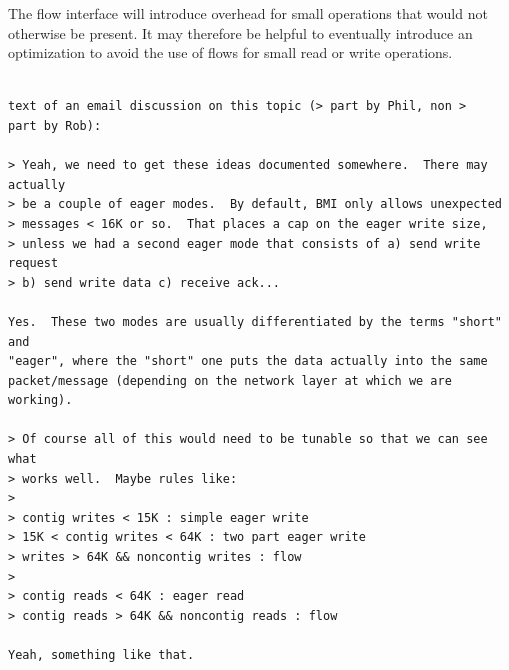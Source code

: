 \documentclass[12pt]{article} %
\begin{document}
The flow interface will introduce overhead for small operations
that would not otherwise be present.  It may therefore be helpful
to eventually introduce an optimization to avoid the use of flows
for small read or write operations.

\begin{verbatim}

text of an email discussion on this topic (> part by Phil, non >
part by Rob):

> Yeah, we need to get these ideas documented somewhere.  There may actually
> be a couple of eager modes.  By default, BMI only allows unexpected
> messages < 16K or so.  That places a cap on the eager write size,
> unless we had a second eager mode that consists of a) send write request
> b) send write data c) receive ack...

Yes.  These two modes are usually differentiated by the terms "short" and
"eager", where the "short" one puts the data actually into the same
packet/message (depending on the network layer at which we are working).

> Of course all of this would need to be tunable so that we can see what
> works well.  Maybe rules like:
> 
> contig writes < 15K : simple eager write
> 15K < contig writes < 64K : two part eager write
> writes > 64K && noncontig writes : flow
> 
> contig reads < 64K : eager read
> contig reads > 64K && noncontig reads : flow

Yeah, something like that.

\end{verbatim}
\end{document}
